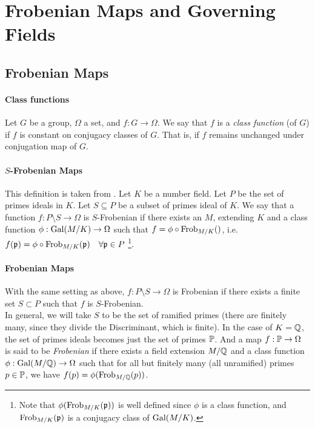 \section{Frobenian Maps and Governing Fields}
\subsection{Frobenian Maps}
\paragraph{Class functions}
Let $G$ be a group, $\Omega$ a set, and $f: G \to \Omega$.
We say that $f$ is a \textit{class function} (of $G$) if $f$ is constant on conjugacy classes of $G$.
That is, if $f$ remains unchanged under conjugation map of $G$.

\paragraph{$S$-Frobenian Maps}
This definition is taken from \cite[§3.3]{LecturesOnN_Xp}.
Let $K$ be a number field. Let $P$ be the set of primes ideals in $K$.
Let $S \subseteq P$ be a subset of primes ideal of $K$.
We say that a function $f: P \setminus S \to \Omega$ is $S$-Frobenian if there exists an $M$, extending $K$ and a class function $\phi: \text{Gal}(M/K) \to \Omega$ such that $f = \phi \circ \text{Frob}_{M/K}()$, i.e. $f(\mathfrak{p})= \phi \circ \text{Frob}_{M/K}(\mathfrak{p}) \quad \forall \mathfrak{p} \in P$ \footnote{Note that $\phi(\text{Frob}_{M/K}(\mathfrak{p}))$ is well defined since $\phi$ is a class function, and $\text{Frob}_{M/K}(\mathfrak{p})$ is a conjugacy class of $\text{Gal}(M/K)$.}.

\paragraph{Frobenian Maps}
With the same setting as above, $f: P \setminus S \to \Omega$ is Frobenian if there exists a finite set $S \subset P$ such that $f$ is $S$-Frobenian.\\
In general, we will take $S$ to be the set of ramified primes (there are finitely many, since they divide the Discriminant, which is finite).
In the case of $K=\mathbb{Q}$, the set of primes ideals becomes just the set of primes $\mathbb{P}$.
And a map $f: \mathbb{P} \to \Omega$ is said to be \textit{Frobenian} if there exists a field extension $M/\mathbb{Q}$ and a class function $\phi:\text{Gal}(M/\mathbb{Q}) \to \Omega$ such that for all but finitely many (all unramified) primes $p \in \mathbb{P}$, we have $f(p)=\phi(\text{Frob}_{M/\mathbb{Q}}(p))$.

